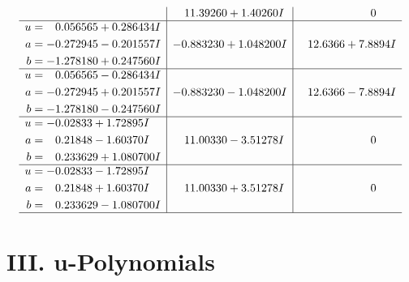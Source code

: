 \documentclass[1p]{elsarticle_modified}
\theoremstyle{definition}
\begin{document}
$$\begin{array}{c|c|c}
 & \phantom{-}11.39260 + 1.40260 I & \phantom{-0.000000 } 0 \\ \hline\begin{aligned}
u &= \phantom{-}0.056565 + 0.286434 I \\
a &= -0.272945 - 0.201557 I \\
b &= -1.278180 + 0.247560 I\end{aligned}
 & -0.883230 + 1.048200 I & \phantom{-}12.6366 + 7.8894 I \\ \hline\begin{aligned}
u &= \phantom{-}0.056565 - 0.286434 I \\
a &= -0.272945 + 0.201557 I \\
b &= -1.278180 - 0.247560 I\end{aligned}
 & -0.883230 - 1.048200 I & \phantom{-}12.6366 - 7.8894 I \\ \hline\begin{aligned}
u &= -0.02833 + 1.72895 I \\
a &= \phantom{-}0.21848 - 1.60370 I \\
b &= \phantom{-}0.233629 + 1.080700 I\end{aligned}
 & \phantom{-}11.00330 - 3.51278 I & \phantom{-0.000000 } 0 \\ \hline\begin{aligned}
u &= -0.02833 - 1.72895 I \\
a &= \phantom{-}0.21848 + 1.60370 I \\
b &= \phantom{-}0.233629 - 1.080700 I\end{aligned}
 & \phantom{-}11.00330 + 3.51278 I & \phantom{-0.000000 } 0\\
 \hline 
 \end{array}$$\newpage
\newpage\renewcommand{\arraystretch}{1}
\centering \section*{ III. u-Polynomials}
\end{document}

